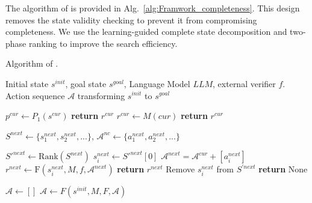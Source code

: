The algorithm of \cmethod is provided in Alg.~\ref{alg:Framwork_completeness}. This design removes the state validity checking to prevent it from compromising completeness. We use the learning-guided complete state decomposition and two-phase ranking to improve the search efficiency. 


\begin{algorithm}[t!] 
\caption{Algorithm of {\method}.}
\label{alg:Framwork} 
\begin{algorithmic}
\REQUIRE Initial state $s^{init}$, goal state $s^{goal}$, Language Model $LLM$, external verifier $f$.
\ENSURE Action sequence $\mathcal{A}$ transforming $s^{init}$ to $s^{goal}$

    \STATE $p^{cur} \gets P_1(s^{cur})$ 
        \STATE \textbf{return} $r^{cur}$
    \ENDIF
    \STATE $r^{cur} \gets M(cur)$ 
        \STATE \textbf{return} $r^{cur}$ 
    \ENDIF

    \STATE $S^{next} \gets \{s^{next}_1, s^{next}_2, ...\}$, $\mathcal{A}^{nc} \gets \{a^{next}_1, a^{next}_2, ...\}$ 
    
        \STATE $S'^{next} \gets \text{Rank}(S^{next})$
        \STATE $s^{next}_i \gets S'^{next}[0]$ 
        \STATE $\mathcal{A}^{next} = \mathcal{A}^{cur} + [a^{next}_i]$
        \STATE $r^{next} \gets \text{F}(s^{next}_i, M, f, \mathcal{A}^{next})$
            \STATE \textbf{return} $r^{next}$
        \ENDIF        
        \STATE Remove $s^{next}_i$ from $S^{'next}$
    \ENDWHILE    
    \STATE \textbf{return} None
    
\ENDFUNCTION
\STATE $\mathcal{A} \gets []$
\STATE $\mathcal{A}\gets F(s^{init}, M, F, \mathcal{A})$
\label{algorithm}
\end{algorithmic}
\end{algorithm}

